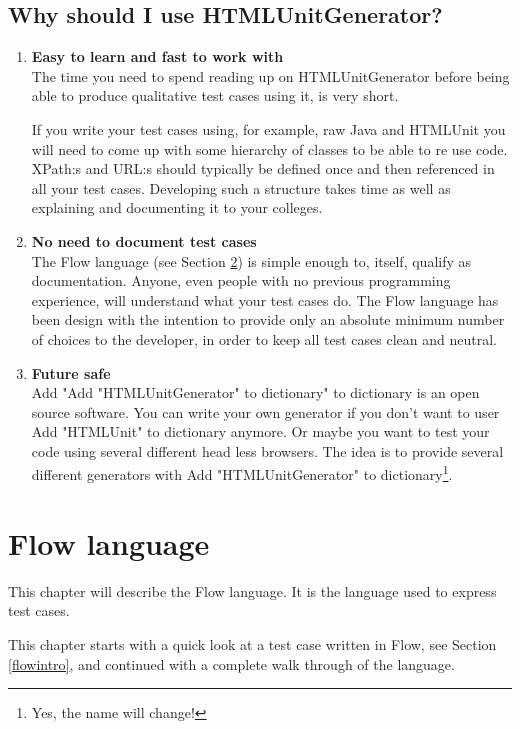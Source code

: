 \documentclass[a4paper,11pt]{kth-mag}
\begin{document}
\section{Why should I use HTMLUnitGenerator?}
\begin{enumerate}
\item \textbf{Easy to learn and fast to work with}\\
The time you need to spend reading up on HTMLUnitGenerator before being able to produce qualitative test cases using it, is very short.

If you write your test cases using, for example, raw Java and HTMLUnit you will need to come up with some hierarchy of classes to be able to re use code. XPath:s and URL:s should typically be defined once and then referenced in all your test cases. Developing such a structure takes time as well as explaining and documenting it to your colleges.

\item \textbf{No need to document test cases}\\
The Flow language (see Section \ref{flowlanguage}) is simple enough to, itself, qualify as documentation. Anyone, even people with no previous programming experience, will understand what your test cases do. The Flow language has been design with the intention to provide only an absolute minimum number of choices to the developer, in order to keep all test cases clean and neutral.

\item \textbf{Future safe}\\
Add "Add "HTMLUnitGenerator" to dictionary" to dictionary is an open source software. You can write your own generator if you don't want to user Add "HTMLUnit" to dictionary anymore. Or maybe you want to test your code using several different head less browsers. The idea is to provide several different generators with Add "HTMLUnitGenerator" to dictionary\footnote{Yes, the name will change!}.
\end{enumerate}

\chapter{Flow language}
\label{flowlanguage}
This chapter will describe the Flow language. It is the language used to express test cases.

This chapter starts with a quick look at a test case written in Flow, see Section \ref{flowintro}, and continued with a complete walk through of the language. 
\end{document}
